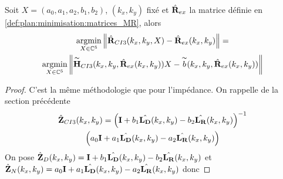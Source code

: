     \begin{prop}
      Soit \(X = (a_0,a_1,a_2,b_1,b_2)\), \((k_x,k_y)\) fixé et \(\hat{\mathbf{R}}_{ex}\) la matrice définie en \ref{def:plan:minimisation:matrices_MR}, alors
      \begin{multline*}
        {\underset{X\in\mathbb C^5}{\operatorname{argmin}}} \left\lVert\hat{\mathbf{R}}_{CI3}(k_x,k_y,X) - \hat{\mathbf{R}}_{ex}(k_x,k_y)\right\rVert =
        \\
        {\underset{X\in\mathbb C^5}{\operatorname{argmin}}} \left\lVert\overset{\thicksim}{\mathbf{H}}_{CI3}(k_x,k_y,\hat{\mathbf{R}}_{ex}(k_x,k_y))X - \overset{\thicksim}{b}(k_x,k_y,\hat{\mathbf{R}}_{ex}(k_x,k_y))\right\rVert
      \end{multline*}
    \end{prop}

    \begin{proof}
      C'est la même méthodologie que pour l'impédance.
      On rappelle de la section précédente
      \begin{multline*}
        \hat{\mathbf{Z}}_{CI3}(k_x,k_y) = \left(\mathbf{I} + b_1 \hat{\mathbf{L_D}}(k_x,k_y) - b_2 \hat{\mathbf{L_R}}(k_x,k_y) \right)^{-1}
        \\
        \left(a_0 \mathbf{I} + a_1 {\hat{\mathbf{L_D}}(k_x,k_y)} - a_2 {\hat{\mathbf{L_R}}(k_x,k_y)}\right)
      \end{multline*}
      On pose \(\hat{\mathbf{Z}}_D(k_x,k_y) = \mathbf{I} + b_1 \hat{\mathbf{L_D}}(k_x,k_y) - b_2 \hat{\mathbf{L_R}}(k_x,k_y)\) et \(\hat{\mathbf{Z}}_N(k_x,k_y) = a_0 \mathbf{I} + a_1 {\hat{\mathbf{L_D}}(k_x,k_y)} - a_2 {\hat{\mathbf{L_R}}(k_x,k_y)}\) donc


\end{proof}
